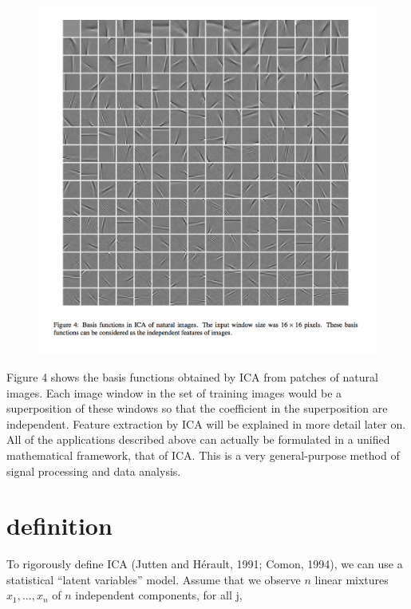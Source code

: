 \documentclass[12pt, a4paper, onecolumn]{IEEEtran}
\begin{document}
\begin{figure}[h]
    \centering
    \includegraphics[width=1\textwidth]{4}
\end{figure}
Figure 4 shows the basis functions obtained by ICA from patches of natural images. Each image window in the set of training images would be a superposition of these windows so that the coefficient in the superposition are independent. Feature extraction by ICA will be explained in more detail later on.
All of the applications described above can actually be formulated in a unified mathematical framework, that of ICA. This is a very general-purpose method of signal processing and data analysis.
\section{definition}
To rigorously define ICA (Jutten and Hérault, 1991; Comon, 1994), we can use a statistical “latent variables” model. Assume that we observe $n$ linear mixtures $x_1,...,x_n$ of $n$ independent components, for all j,
\end{document}
